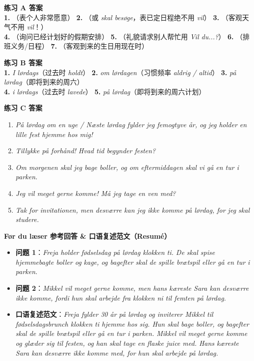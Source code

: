 \begin{answerbox}
\textbf{练习 A 答案}\\
\textbf{1.} （表个人非常愿意） \quad \textbf{2.} （或 \textit{skal besøge}，表已定日程绝不用 \textit{vil}） \quad \textbf{3.} （客观天气不用 \textit{vil}！）\\
\textbf{4.} （询问已经计划好的假期安排） \quad \textbf{5.} （礼貌请求别人帮忙用 \textit{Vil du...?}） \quad \textbf{6.} （排班义务/日程） \quad \textbf{7.} （客观到来的生日用现在时）

\vspace{0.2em}
\textbf{练习 B 答案}\\
\textbf{1.} \textit{I lørdags}（过去时 \textit{holdt}） \quad \textbf{2.} \textit{om lørdagen}（习惯频率 \textit{aldrig / altid}） \quad \textbf{3.} \textit{på lørdag}（即将到来的周六）\\
\textbf{4.} \textit{i lørdags}（过去时 \textit{lavede}） \quad \textbf{5.} \textit{på lørdag}（即将到来的周六计划）

\vspace{0.2em}

\textbf{练习 C 答案}
\begin{enumerate}
  \item \textit{På lørdag om en uge / Næste lørdag fylder jeg femogtyve år, og jeg holder en lille fest hjemme hos mig!}
  \item \textit{Tillykke på forhånd! Hvad tid begynder festen?}
  \item \textit{Om morgenen skal jeg bage boller, og om eftermiddagen skal vi gå en tur i parken.}
  \item \textit{Jeg vil meget gerne komme! Må jeg tage en ven med?}
  \item \textit{Tak for invitationen, men desværre kan jeg ikke komme på lørdag, for jeg skal studere.}
\end{enumerate}

\textbf{Før du læser 参考回答 \& 口语复述范文（Resumé）}
\begin{itemize}
  \item \textbf{问题 1}：\textit{Freja holder fødselsdag på lørdag klokken ti. De skal spise hjemmebagte boller og kage, og bagefter skal de spille brætspil eller gå en tur i parken.}
  \item \textbf{问题 2}：\textit{Mikkel vil meget gerne komme, men hans kæreste Sara kan desværre ikke komme, fordi hun skal arbejde fra klokken ni til femten på lørdag.}
  \item \textbf{口语复述范文}：\textit{Freja fylder 30 år på lørdag og inviterer Mikkel til fødselsdagsbrunch klokken ti hjemme hos sig. Hun skal bage boller, og bagefter skal de spille brætspil eller gå en tur i parken. Mikkel vil meget gerne komme og glæder sig til festen, og han skal tage en flaske juice med. Hans kæreste Sara kan desværre ikke komme med, for hun skal arbejde på lørdag.}
\end{itemize}
\end{answerbox}
